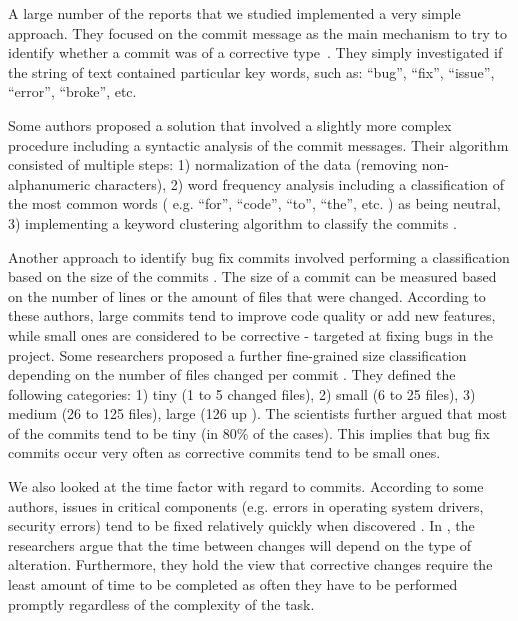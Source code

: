 A large number of the reports that we studied implemented a very simple approach. They focused on the commit message as the main mechanism to try to identify whether a commit was of a corrective type~\cite{Hattori2008, Ratzinger2008, Hindle2008}. They simply investigated if the string of text contained particular key words, such as: ``bug'', ``fix'', ``issue'', ``error'', ``broke'', etc.\par

Some authors proposed a solution that involved a slightly more complex procedure including a syntactic analysis of the commit messages. Their algorithm consisted of multiple steps: 1) normalization of the data (removing non-alphanumeric characters), 2) word frequency analysis including a classification of the most common words ( e.g. ``for'', ``code'', ``to'', ``the'', etc. ) as being neutral, 3) implementing a keyword clustering algorithm to classify the commits \cite{Mockus2000}.\par

Another approach to identify bug fix commits involved performing a classification based on the size of the commits \cite{Hattori2008,Mockus2000,Hindle2008}. The size of a commit can be measured based on the number of lines or the amount of files that were changed. According to these authors, large commits tend to improve code quality or add new features, while small ones are considered to be corrective - targeted at fixing bugs in the project. Some researchers proposed a further fine-grained size classification depending on the number of files changed per commit \cite{Hattori2008}. They defined the following categories: 1) tiny (1 to 5 changed files), 2) small (6 to 25 files), 3) medium (26 to 125 files), large (126 up ). The scientists further argued that most of the commits tend to be tiny (in 80\% of the cases). This implies that bug fix commits occur very often as corrective commits tend to be small ones.\par

We also looked at the time factor with regard to commits. According to some authors, issues in critical components (e.g. errors in operating system drivers, security errors) tend to be fixed relatively quickly when discovered \cite{Livshits2005}. In \cite{Mockus2000}, the researchers argue that the time between changes will depend on the type of alteration. Furthermore, they hold the view that corrective changes require the least amount of time to be completed as often they have to be performed promptly regardless of the complexity of the task.\par

